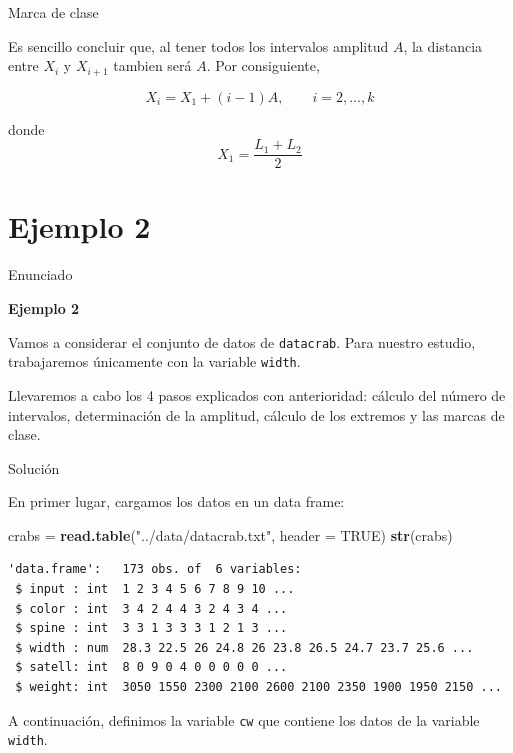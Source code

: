 \documentclass[
  ignorenonframetext,
]{beamer}
\newenvironment{Shaded}{\begin{snugshade}}{\end{snugshade}}
\newcommand{\DataTypeTok}[1]{\textcolor[rgb]{0.13,0.29,0.53}{#1}}
\newcommand{\KeywordTok}[1]{\textcolor[rgb]{0.13,0.29,0.53}{\textbf{#1}}}
\newcommand{\NormalTok}[1]{#1}
\newcommand{\OperatorTok}[1]{\textcolor[rgb]{0.81,0.36,0.00}{\textbf{#1}}}
\newcommand{\OtherTok}[1]{\textcolor[rgb]{0.56,0.35,0.01}{#1}}
\newcommand{\StringTok}[1]{\textcolor[rgb]{0.31,0.60,0.02}{#1}}
\begin{document}
\begin{frame}{Marca de clase}
\protect\hypertarget{marca-de-clase-1}{}

Es sencillo concluir que, al tener todos los intervalos amplitud \(A\),
la distancia entre \(X_i\) y \(X_{i+1}\) tambien será \(A\). Por
consiguiente,

\[X_{i} = X_1+ (i-1)A,\qquad i=2,\dots,k\]

donde \[X_1 = \frac{L_1+L_2}{2}\]

\end{frame}

\hypertarget{ejemplo-2}{%
\section{Ejemplo 2}\label{ejemplo-2}}

\begin{frame}[fragile]{Enunciado}
\protect\hypertarget{enunciado}{}

\textbf{Ejemplo 2}

Vamos a considerar el conjunto de datos de \texttt{datacrab}. Para
nuestro estudio, trabajaremos únicamente con la variable \texttt{width}.

Llevaremos a cabo los 4 pasos explicados con anterioridad: cálculo del
número de intervalos, determinación de la amplitud, cálculo de los
extremos y las marcas de clase.

\end{frame}

\begin{frame}[fragile]{Solución}
\protect\hypertarget{soluciuxf3n}{}

En primer lugar, cargamos los datos en un data frame:

\begin{Shaded}
\begin{Highlighting}[]
\NormalTok{crabs =}\StringTok{ }\KeywordTok{read.table}\NormalTok{(}\StringTok{"../data/datacrab.txt"}\NormalTok{, }\DataTypeTok{header =} \OtherTok{TRUE}\NormalTok{)}
\KeywordTok{str}\NormalTok{(crabs)}
\end{Highlighting}
\end{Shaded}

\begin{verbatim}
'data.frame':   173 obs. of  6 variables:
 $ input : int  1 2 3 4 5 6 7 8 9 10 ...
 $ color : int  3 4 2 4 4 3 2 4 3 4 ...
 $ spine : int  3 3 1 3 3 3 1 2 1 3 ...
 $ width : num  28.3 22.5 26 24.8 26 23.8 26.5 24.7 23.7 25.6 ...
 $ satell: int  8 0 9 0 4 0 0 0 0 0 ...
 $ weight: int  3050 1550 2300 2100 2600 2100 2350 1900 1950 2150 ...
\end{verbatim}

\begin{Shaded}
\end{Shaded}

A continuación, definimos la variable \texttt{cw} que contiene los datos
de la variable \texttt{width}.

\end{frame}
\end{document}
